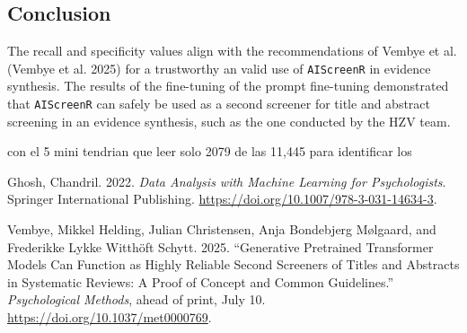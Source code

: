 \documentclass[
  letterpaper,
  DIV=11,
  numbers=noendperiod]{scrartcl}
\newlength{\cslhangindent}
\newenvironment{CSLReferences}[2] %
 {\begin{list}{}{%
  \setlength{\itemindent}{0pt}
  \setlength{\leftmargin}{0pt}
  \setlength{\parsep}{0pt}
  \ifodd #1
   \setlength{\leftmargin}{\cslhangindent}
   \setlength{\itemindent}{-1\cslhangindent}
  \fi
  \setlength{\itemsep}{#2\baselineskip}}}
 {\end{list}}
\begin{document}
\subsection{Conclusion}\label{conclusion}

The recall and specificity values align with the recommendations of
Vembye et al. (Vembye et al. 2025) for a trustworthy an valid use of
\texttt{AIScreenR} in evidence synthesis. The results of the fine-tuning
of the prompt fine-tuning demonstrated that \texttt{AIScreenR} can
safely be used as a second screener for title and abstract screening in
an evidence synthesis, such as the one conducted by the HZV team.

con el 5 mini tendrian que leer solo 2079 de las 11,445 para identificar
los

\protect{}\label{refs}
\begin{CSLReferences}{1}{1}
Ghosh, Chandril. 2022. \emph{Data Analysis with Machine Learning for
Psychologists}. Springer International Publishing.
\url{https://doi.org/10.1007/978-3-031-14634-3}.

Vembye, Mikkel Helding, Julian Christensen, Anja Bondebjerg Mølgaard,
and Frederikke Lykke Witthöft Schytt. 2025. {``Generative Pretrained
Transformer Models Can Function as Highly Reliable Second Screeners of
Titles and Abstracts in Systematic Reviews: A Proof of Concept and
Common Guidelines.''} \emph{Psychological Methods}, ahead of print, July
10. \url{https://doi.org/10.1037/met0000769}.

\end{CSLReferences}
\end{document}
